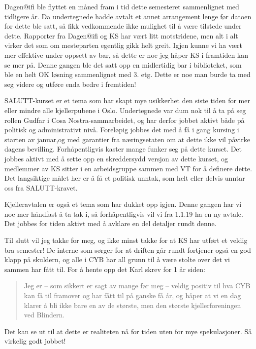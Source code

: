 \documentclass[10pt,norsk,a4paper]{article}
\begin{document}
\begin{multicols}{2}
Dagen@ifi ble flyttet en måned fram i tid dette semesteret sammenlignet med tidligere år.
Da undertegnede hadde avtalt et annet arrangement lenge før datoen for dette ble satt, så fikk vedkommende ikke mulighet til å være tilstede under dette.
Rapporter fra Dagen@ifi og KS har vært litt motstridene, men alt i alt virker det som om mesteparten egentlig gikk helt greit.
Igjen kunne vi ha vært mer effektive under oppsett av bar, så dette er noe jeg håper KS i framtiden kan se mer på.
Denne gangen ble det satt opp en midlertidig bar i biblioteket, som ble en helt OK løsning sammenlignet med 3. etg.
Dette er noe man burde ta med seg videre og utføre enda bedre i fremtiden!

SALUTT-kurset er et tema som har skapt mye usikkerhet den siste tiden for mer eller mindre alle kjellerpubene i Oslo.
Undertegnede var dum nok til å ta på seg rollen Gudfar i Cosa Nostra-sammarbeidet, og har derfor jobbet aktivt både på politisk og administrativt nivå.
Foreløpig jobbes det med å få i gang kursing i starten av januar,og med garantier fra næringsetaten om at dette ikke vil påvirke dagens bevilling.
Forhåpentligvis kaster mange funker seg på dette kurset.
Det jobbes aktivt med å sette opp en skreddersydd versjon av dette kurset,
og medlemmer av KS sitter i en arbeidsgruppe sammen med VT for å definere dette.
Det langsiktige målet her er å få et politisk unntak, som helt eller delvis unntar oss fra SALUTT-kravet.

Kjelleravtalen er også et tema som har dukket opp igjen.
Denne gangen har vi noe mer håndfast å ta tak i, så forhåpentligvis vil vi fra 1.1.19 ha en ny avtale.
Det jobbes for tiden aktivt med å avklare en del detaljer rundt denne.

Til slutt vil jeg takke for meg, og ikke minst takke for at KS har utført et veldig bra semester!
De interne som sørger for at driften går rundt fortjener også en god klapp på skuldern,
og alle i CYB har all grunn til å være stolte over det vi sammen har fått til.
For å hente opp det Karl skrev for 1 år siden:
\begin{quote}
Jeg er – som sikkert er sagt av mange før meg – veldig positiv til hva CYB kan få til framover og har fått til på ganske få år, og håper at vi en dag klarer å bli ikke bare en av de største, men den største kjellerforeningen ved Blindern.
\end{quote}
Det kan se ut til at dette er realiteten nå for tiden uten for mye spekulasjoner.
Så virkelig godt jobbet!
\end{multicols}
\end{document}
